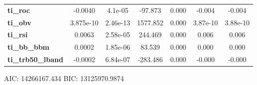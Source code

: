 \begin{center}
\begin{tabular}{lcccccc}
\textbf{ti\_roc}            &      -0.0040  &      4.1e-05     &   -97.873  &         0.000        &       -0.004    &       -0.004     \\
\textbf{ti\_obv}            &    3.875e-10  &     2.46e-13     &  1577.852  &         0.000        &     3.87e-10    &     3.88e-10     \\
\textbf{ti\_rsi}            &       0.0063  &     2.58e-05     &   244.469  &         0.000        &        0.006    &        0.006     \\
\textbf{ti\_bb\_bbm}        &       0.0002  &     1.85e-06     &    83.539  &         0.000        &        0.000    &        0.000     \\
\textbf{ti\_trb50\_lband}   &      -0.0002  &     6.84e-07     &  -283.486  &         0.000        &       -0.000    &       -0.000     \\
\bottomrule
\end{tabular}
\end{center}

AIC: 14266167.434 BIC: 13125970.9874

